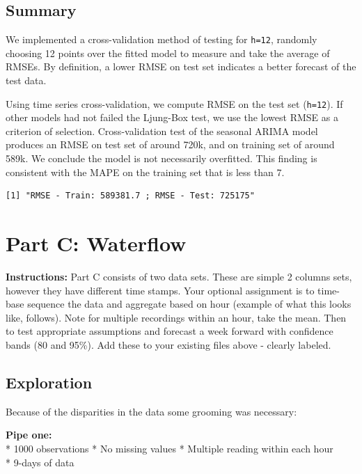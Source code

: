 \documentclass[openany]{book}
\renewenvironment{quote}{\begin{myquote}}{\end{myquote}}
\begin{document}
\hypertarget{summary-1}{%
\section{Summary}\label{summary-1}}

We implemented a cross-validation method of testing for \texttt{h=12},
randomly choosing 12 points over the fitted model to measure and take
the average of RMSEs. By definition, a lower RMSE on test set indicates
a better forecast of the test data.

Using time series cross-validation, we compute RMSE on the test set
(\texttt{h=12}). If other models had not failed the Ljung-Box test, we
use the lowest RMSE as a criterion of selection. Cross-validation test
of the seasonal ARIMA model produces an RMSE on test set of around 720k,
and on training set of around 589k. We conclude the model is not
necessarily overfitted. This finding is consistent with the MAPE on the
training set that is less than 7.

\begin{verbatim}
[1] "RMSE - Train: 589381.7 ; RMSE - Test: 725175"
\end{verbatim}

\hypertarget{part-c-waterflow}{%
\chapter{Part C: Waterflow}\label{part-c-waterflow}}

\begin{quote}
\textbf{Instructions:} Part C consists of two data sets. These are
simple 2 columns sets, however they have different time stamps. Your
optional assignment is to time-base sequence the data and aggregate
based on hour (example of what this looks like, follows). Note for
multiple recordings within an hour, take the mean. Then to test
appropriate assumptions and forecast a week forward with confidence
bands (80 and 95\%). Add these to your existing files above - clearly
labeled.
\end{quote}

\hypertarget{exploration-2}{%
\section{Exploration}\label{exploration-2}}

Because of the disparities in the data some grooming was necessary:

\textbf{Pipe one:}\\
* 1000 observations * No missing values * Multiple reading within each
hour\\
* 9-days of data
\end{document}
